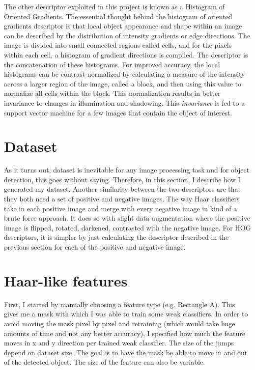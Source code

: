 \documentclass[%
 aip,
 jmp,%
 amsmath,amssymb,
 reprint,%
]{revtex4-1}
\begin{document}
The other descriptor exploited in this project is known as a Histogram of Oriented Gradients. The essential thought behind the histogram of oriented gradients descriptor is that local object appearance and shape within an image can be described by the distribution of intensity gradients or edge directions. The image is divided into small connected regions called cells, and for the pixels within each cell, a histogram of gradient directions is compiled. The descriptor is the concatenation of these histograms. For improved accuracy, the local histograms can be contrast-normalized by calculating a measure of the intensity across a larger region of the image, called a block, and then using this value to normalize all cells within the block. This normalization results in better invariance to changes in illumination and shadowing. This \textit{invariance} is fed to a support vector machine for a few images that contain the object of interest. 

\section{Dataset}
As it turns out, dataset is inevitable for any image processing task and for object detection, this goes without saying. Therefore, in this section, I describe how I generated my dataset. Another similarity between the two descriptors are that they both need a set of positive and negative images. The way Haar classifiers take in each positive image and merge with every negative image in kind of a brute force approach. It does so with slight data augmentation where the positive image is flipped, rotated, darkened, contrasted with the negative image. 
For HOG descriptors, it is simpler by just calculating the descriptor described in the previous section for each of the positive and negative image. 

\section{Haar-like features}
First, I started by manually choosing a feature type (e.g. Rectangle A). This gives me a mask with which I was able to train some weak classifiers. In order to avoid moving the mask pixel by pixel and retraining (which would take huge amounts of time and not any better accuracy), I specified how much the feature moves in x and y direction per trained weak classifier. The size of the jumps depend on dataset size. The goal is to have the mask be able to move in and out of the detected object. The size of the feature can also be variable.
\end{document}
